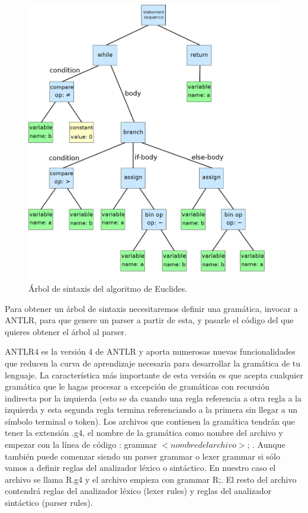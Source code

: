 \begin{figure}[] %
\centering
\includegraphics[scale=0.55]{imagenes/arbol.png}  %
\caption{Árbol de sintaxis del algoritmo de Euclides.} \label{fig:arbol_euclides}
\end{figure}


Para obtener un árbol de sintaxis necesitaremos definir una gramática, invocar a ANTLR, para que genere un parser a partir de esta, y pasarle el código del que quieres obtener el árbol al parser.
\newline

ANTLR4 es la versión 4 de ANTLR y aporta numerosas nuevas funcionalidades que reducen la curva de aprendizaje necesaria para desarrollar la gramática de tu lenguaje. 
\newline
La característica más importante de esta versión es que acepta cualquier gramática que le hagas procesar a excepción de gramáticas con recursión indirecta por la izquierda (esto se da cuando una regla referencia a otra regla a la izquierda y esta segunda regla termina referenciando a la primera sin llegar a un símbolo terminal o token).
\newline
Los archivos que contienen la gramática tendrán que tener la extensión .g4, el nombre de la gramática como nombre del archivo y empezar con la línea de código : grammar $<nombre del archivo>$; . Aunque también puede comenzar siendo un parser grammar o lexer grammar si sólo vamos a definir reglas del analizador léxico o sintáctico. En nuestro caso el archivo se llama R.g4 y el archivo empieza con grammar R;.
\newline
El resto del archivo contendrá reglas del analizador léxico (lexer rules) y reglas del analizador sintáctico (parser rules).

